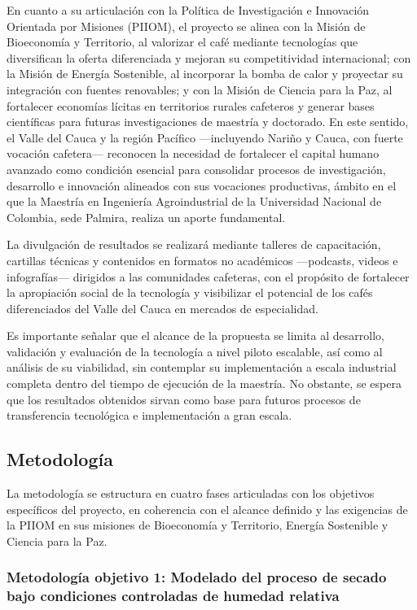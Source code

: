 En cuanto a su articulación con la Política de Investigación e Innovación Orientada 
por Misiones (PIIOM), el proyecto se alinea con la Misión de Bioeconomía y Territorio, 
al valorizar el café mediante tecnologías que diversifican la oferta diferenciada y 
mejoran su competitividad internacional; con la Misión de Energía Sostenible, al 
incorporar la bomba de calor y proyectar su integración con fuentes renovables; y con 
la Misión de Ciencia para la Paz, al fortalecer economías lícitas en territorios 
rurales cafeteros y generar bases científicas para futuras investigaciones de maestría 
y doctorado. En este sentido, el Valle del Cauca y la región Pacífico —incluyendo 
Nariño y Cauca, con fuerte vocación cafetera— reconocen la necesidad de fortalecer 
el capital humano avanzado como condición esencial para consolidar procesos de 
investigación, desarrollo e innovación alineados con sus vocaciones productivas, 
ámbito en el que la Maestría en Ingeniería Agroindustrial de la Universidad Nacional 
de Colombia, sede Palmira, realiza un aporte fundamental.

La divulgación de resultados se realizará mediante talleres de capacitación, cartillas 
técnicas y contenidos en formatos no académicos —podcasts, videos e infografías— 
dirigidos a las comunidades cafeteras, con el propósito de fortalecer la apropiación 
social de la tecnología y visibilizar el potencial de los cafés diferenciados del 
Valle del Cauca en mercados de especialidad.

Es importante señalar que el alcance de la propuesta se limita al desarrollo, validación y
evaluación de la tecnología a nivel piloto escalable, así como al análisis de su viabilidad, sin
contemplar su implementación a escala industrial completa dentro del tiempo de ejecución
de la maestría. No obstante, se espera que los resultados obtenidos sirvan como base para
futuros procesos de transferencia tecnológica e implementación a gran escala.

\subsection{Metodología}

La metodología se estructura en cuatro fases articuladas con los objetivos específicos 
del proyecto, en coherencia con el alcance definido y las exigencias de la PIIOM en 
sus misiones de Bioeconomía y Territorio, Energía Sostenible y Ciencia para la Paz.

\subsubsection*{Metodología objetivo 1: Modelado del proceso de secado bajo condiciones controladas 
de humedad relativa}

